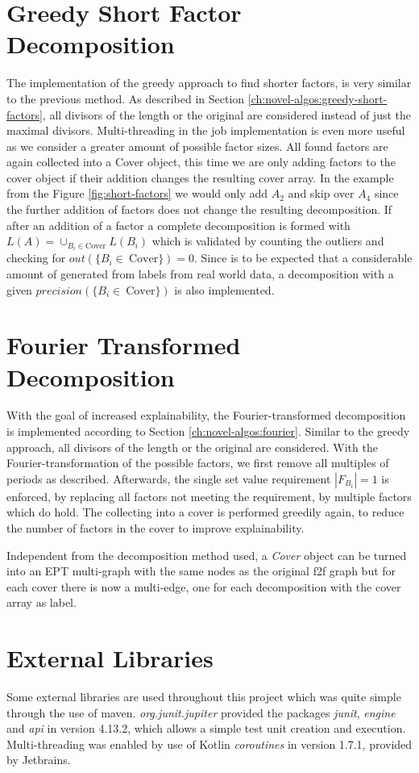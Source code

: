 \section{Greedy Short Factor Decomposition}
The implementation of the greedy approach to find shorter factors, is very similar to the previous method. As described in Section \ref{ch:novel-algos:greedy-short-factors}, all divisors of the length or the original \DFA are considered instead of just the maximal divisors. Multi-threading in the job implementation is even more useful as we consider a greater amount of possible factor sizes. All found factors are again collected into a Cover object, this time we are only adding factors to the cover object if their addition changes the resulting cover array. In the example from the Figure \ref{fig:short-factors} we would only add $A_2$ and skip over $A_4$ since the further addition of factors does not change the resulting decomposition. If after an addition of a factor a complete decomposition is formed with $L(A) = \cup_{B_i \in \text{Cover}} L(B_i)$ which is validated by counting the outliers and checking for $out(\{B_i \in~\text{Cover}\}) = 0$. Since is to be expected that a considerable amount of \DFAs generated from labels from real world data, a decomposition with a given $precision(\{B_i \in~\text{Cover}\})$ is also implemented.

\section{Fourier Transformed Decomposition}
With the goal of increased explainability, the Fourier-transformed decomposition is implemented according to Section \ref{ch:novel-algos:fourier}. Similar to the greedy approach, all divisors of the length or the original \DFA are considered. With the Fourier-transformation of the possible factors, we first remove all multiples of periods as described. Afterwards, the single set value requirement $|F_{B_i}| = 1$ is enforced, by replacing all factors not meeting the requirement, by multiple factors which do hold. The collecting into a cover is performed greedily again, to reduce the number of factors in the cover to improve explainability.

Independent from the decomposition method used, a \textit{Cover} object can be turned into an EPT multi-graph with the same nodes as the original f2f graph but for each cover there is now a multi-edge, one for each decomposition with the cover array as label.

\section{External Libraries}
Some external libraries are used throughout this project which was quite simple through the use of maven. \emph{org.junit.jupiter} provided the packages \emph{junit}, \emph{engine} and \emph{api} in version 4.13.2, which allows a simple test unit creation and execution. Multi-threading was enabled by use of Kotlin \emph{coroutines} in version 1.7.1, provided by Jetbrains.

